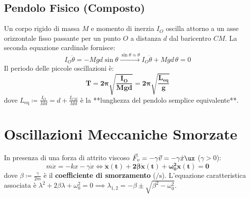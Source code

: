 \subsection{Pendolo Fisico (Composto)}
Un corpo rigido di massa $M$ e momento di inerzia $I_O$ oscilla attorno a un asse orizzontale fisso passante per un punto $O$ a distanza $d$ dal baricentro $CM$.
La seconda equazione cardinale fornisce:
\begin{equation}
    I_O \ddot{\theta} = -M g d \sin\theta \xrightarrow{\sin\theta\approx\theta} I_O \ddot{\theta} + Mgd\,\theta = 0
\end{equation}
Il periodo delle piccole oscillazioni è:
\begin{equation}
    \mathbf{T = 2\pi\sqrt{\frac{I_O}{Mgd}} = 2\pi\sqrt{\frac{L_{\text{eq}}}{g}}}
    \label{eq:pendolo_fisico}
\end{equation}
dove $L_{\text{eq}} \coloneqq \frac{I_O}{Md} = d + \frac{I_{CM}}{Md}$ è la **lunghezza del pendolo semplice equivalente**.

\section{Oscillazioni Meccaniche Smorzate}
\label{sec:oscillazioni_smorzate}

In presenza di una forza di attrito viscoso $\vec{F}_v = -\gamma\vec{v} = -\gamma\dot{x}\ux$ ($\gamma > 0$):
\begin{equation}
    m\ddot{x} = -kx - \gamma\dot{x} \iff \mathbf{\ddot{x}(t) + 2\beta\dot{x}(t) + \omega_0^2 x(t) = 0}
    \label{eq:edo_smorzato}
\end{equation}
dove $\beta \coloneqq \frac{\gamma}{2m}$ è il \textbf{coefficiente di smorzamento} ($\si{\per\second}$). L'equazione caratteristica associata è $\lambda^2 + 2\beta\lambda + \omega_0^2 = 0 \implies \lambda_{1,2} = -\beta \pm \sqrt{\beta^2 - \omega_0^2}$.

\begin{center}
\end{center}

